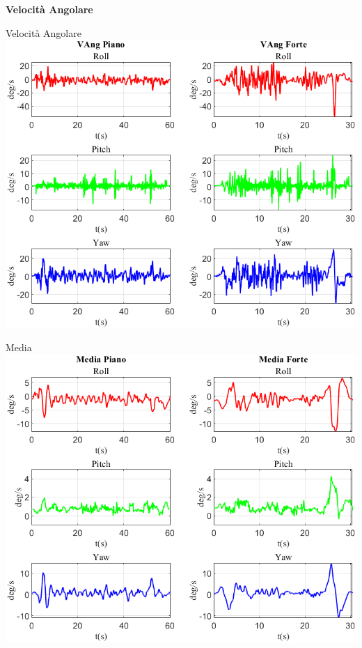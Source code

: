 \documentclass[beamer]{standalone}
\begin{document}
	\begin{frame}
		\color{blue}\centering\Huge{\textbf{Velocità Angolare}}	
	\end{frame}
	
	\begin{frame}{{Velocità Angolare}}
		\centering\includegraphics[height=.8\textheight]{figure/VAng/VAng}
	\end{frame}
	
	\begin{frame}{{Media}}
		\centering\includegraphics[height=.8\textheight]{figure/VAng/Media}
	\end{frame}
	
\end{document}
